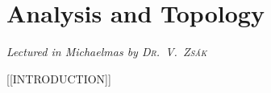 \chapter[Analysis and Topology \\ \textnormal{\emph{Lectured in Michaelmas \oldstylenums{2021} by \textsc{Dr.\ V.\ Zs\'ak}}}]{Analysis and Topology}
\emph{\Large Lectured in Michaelmas  by \textsc{Dr.\ V.\ Zs\'ak}}

[[INTRODUCTION]]


